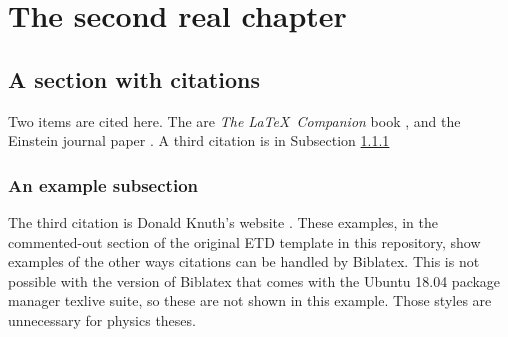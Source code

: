 \chapter{The second real chapter}\label{ch:chap3}
\section{A section with citations}\label{sec:seccite}

Two items are cited here. The are  \textit{The \LaTeX\ Companion} book \cite{latexcompanion}, and the Einstein journal paper \cite{einstein}. A third citation is in Subsection \ref{subsec:subsec}

\subsection{An example subsection}\label{subsec:subsec}

The third citation is Donald Knuth's website \cite{knuthwebsite}. These examples, in the commented-out section of the original ETD template in this repository, show examples of the other ways citations can be handled by Biblatex. This is not possible with the version of Biblatex that comes with the Ubuntu 18.04 package manager texlive suite, so these are not shown in this example. Those styles are unnecessary for physics theses.


